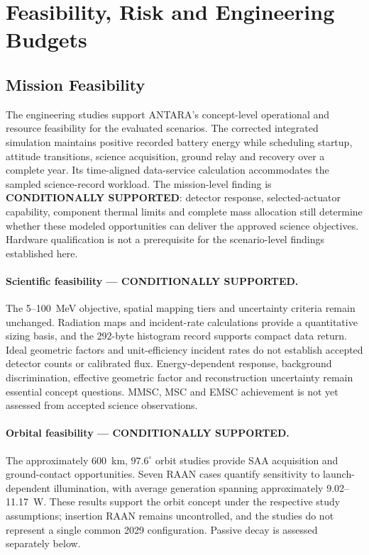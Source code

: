 \section{Feasibility, Risk and Engineering Budgets}\label{mission-completion-requirements}
\subsection{Mission Feasibility}\label{sec:mission-feasibility}
The engineering studies support ANTARA's concept-level operational and resource feasibility for the evaluated scenarios. The corrected integrated simulation maintains positive recorded battery energy while scheduling startup, attitude transitions, science acquisition, ground relay and recovery over a complete year. Its time-aligned data-service calculation accommodates the sampled science-record workload. The mission-level finding is \textbf{CONDITIONALLY SUPPORTED}: detector response, selected-actuator capability, component thermal limits and complete mass allocation still determine whether these modeled opportunities can deliver the approved science objectives. Hardware qualification is not a prerequisite for the scenario-level findings established here.

\paragraph{Scientific feasibility --- CONDITIONALLY SUPPORTED.}
The 5--100~MeV objective, spatial mapping tiers and uncertainty criteria remain unchanged. Radiation maps and incident-rate calculations provide a quantitative sizing basis, and the 292-byte histogram record supports compact data return. Ideal geometric factors and unit-efficiency incident rates do not establish accepted detector counts or calibrated flux. Energy-dependent response, background discrimination, effective geometric factor and reconstruction uncertainty remain essential concept questions. MMSC, MSC and EMSC achievement is not yet assessed from accepted science observations.

\paragraph{Orbital feasibility --- CONDITIONALLY SUPPORTED.}
The approximately 600~km, $97.6^\circ$ orbit studies provide SAA acquisition and ground-contact opportunities. Seven RAAN cases quantify sensitivity to launch-dependent illumination, with average generation spanning approximately 9.02--11.17~W. These results support the orbit concept under the respective study assumptions; insertion RAAN remains uncontrolled, and the studies do not represent a single common 2029 configuration. Passive decay is assessed separately below.


